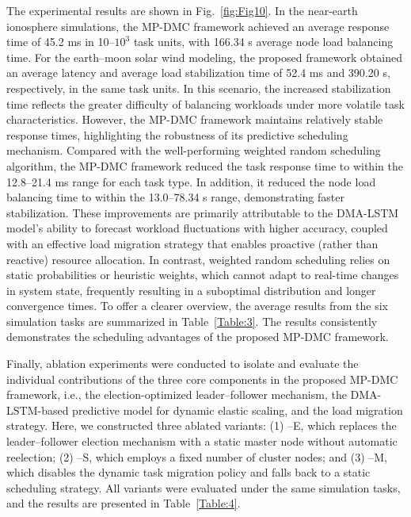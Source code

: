 \documentclass[twoside,twocolumn]{article}
\begin{document}
The experimental results are shown in Fig.~\ref{fig:Fig10}. In the near-earth ionosphere simulations, the MP-DMC framework achieved an average response time of 45.2 ms in 10--$10^3$ task units, with 166.34 s average node load balancing time. For the earth--moon solar wind modeling, the proposed framework obtained an average latency and average load stabilization time of 52.4 ms and 390.20 s, respectively, in the same task units. In this scenario, the increased stabilization time reflects the greater difficulty of balancing workloads under more volatile task characteristics. However, the MP-DMC framework maintains relatively stable response times, highlighting the robustness of its predictive scheduling mechanism. Compared with the well-performing weighted random scheduling algorithm, the MP-DMC framework reduced the task response time to within the 12.8--21.4 ms range for each task type. In addition, it reduced the node load balancing time to within the 13.0--78.34 s range, demonstrating faster stabilization. These improvements are primarily attributable to the DMA-LSTM model's ability to forecast workload fluctuations with higher accuracy, coupled with an effective load migration strategy that enables proactive (rather than reactive) resource allocation. In contrast, weighted random scheduling relies on static probabilities or heuristic weights, which cannot adapt to real-time changes in system state, frequently resulting in a suboptimal distribution and longer convergence times. To offer a clearer overview, the average results from the six simulation tasks are summarized in Table~\ref{Table:3}. The results consistently demonstrates the scheduling advantages of the proposed MP-DMC framework.

Finally, ablation experiments were conducted to isolate and evaluate the individual contributions of the three core components in the proposed MP-DMC framework, i.e., the election-optimized leader--follower mechanism, the DMA-LSTM-based predictive model for dynamic elastic scaling, and the load migration strategy. Here, we constructed three ablated variants: (1) --E, which replaces the leader--follower election mechanism with a static master node without automatic reelection; (2) --S, which employs a fixed number of cluster nodes; and (3) --M, which disables the dynamic task migration policy and falls back to a static scheduling strategy. All variants were evaluated under the same simulation tasks, and the results are presented in Table~\ref{Table:4}.
\end{document}

